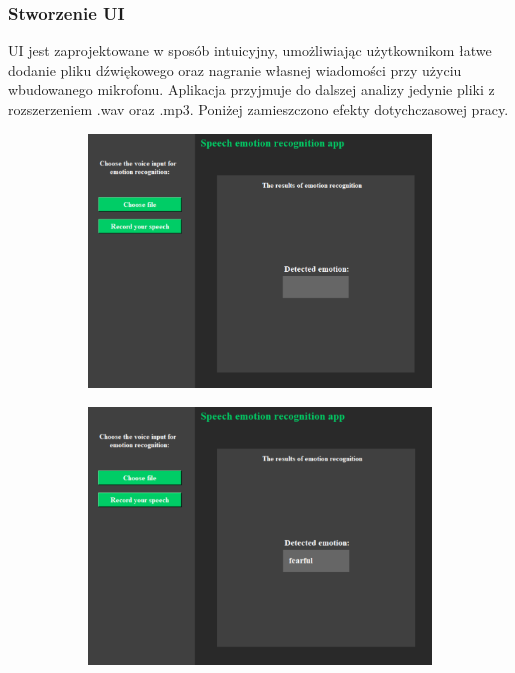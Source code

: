 \documentclass[12pt,titlepage]{article}
\begin{document}
\subsubsection{Stworzenie UI}
UI jest zaprojektowane w sposób intuicyjny, umożliwiając użytkownikom łatwe dodanie pliku dźwiękowego oraz nagranie własnej wiadomości przy użyciu wbudowanego mikrofonu.
Aplikacja przyjmuje do dalszej analizy jedynie pliki z rozszerzeniem .wav oraz .mp3. Poniżej zamieszczono efekty dotychczasowej pracy.
\begin{figure}[ht]
    \centering
    \begin{subfigure}[b]{0.3\textwidth}
        \centering
        \includegraphics[width=\textwidth]{img/1.png}
        \label{fig:sub1}
    \end{subfigure}
    \hfill
    \begin{subfigure}[b]{0.3\textwidth}
        \centering
        \includegraphics[width=\textwidth]{img/2.png}

\end{subfigure}
\end{figure}
\end{document}
